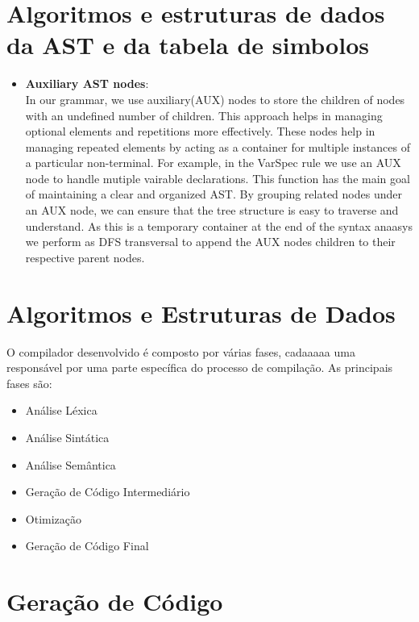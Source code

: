 \documentclass[12pt]{article}
\begin{document}
\section{Algoritmos e estruturas de dados da AST e da tabela de simbolos}
\begin{itemize}
    \item \textbf{Auxiliary AST nodes}: \\In our grammar, we use auxiliary(AUX) nodes to store the children of nodes with an undefined number of children. This approach helps in managing optional elements and repetitions more effectively. These nodes help in managing repeated elements by acting as a container for multiple instances of a particular non-terminal. For example, in the VarSpec rule we use an AUX node to handle mutiple vairable declarations. This function has the main goal of maintaining a clear and organized AST. By grouping related nodes under an AUX node, we can ensure that the tree structure is easy to traverse and understand. As this is a temporary container at the end of the syntax anaasys we perform as DFS transversal to append the AUX nodes children to their respective parent nodes.
\end{itemize}

\section{Algoritmos e Estruturas de Dados}
O compilador desenvolvido é composto por várias fases, cadaaaaa uma responsável por uma parte específica do processo de compilação. As principais fases são:

\begin{itemize}
    \item Análise Léxica
    \item Análise Sintática
    \item Análise Semântica
    \item Geração de Código Intermediário
    \item Otimização
    \item Geração de Código Final
\end{itemize}

\section{Geração de Código}
\end{document}
